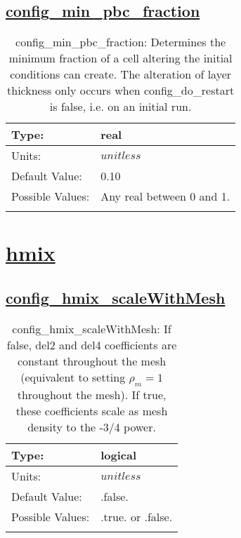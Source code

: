 \subsection[config\_min\_pbc\_fraction]{\hyperref[sec:nm_tab_partial_bottom_cells]{config\_min\_pbc\_fraction}}
\label{subsec:nm_sec_config_min_pbc_fraction}
\begin{center}
\begin{longtable}{| p{2.0in} || p{4.0in} |}
    \hline
    Type: & real \\
    \hline
    Units: & $unitless$ \\
    \hline
    Default Value: & 0.10 \\
    \hline
    Possible Values: & Any real between 0 and 1. \\
    \hline
    \caption{config\_min\_pbc\_fraction: Determines the minimum fraction of a cell altering the initial conditions can create. The alteration of layer thickness only occurs when config\_do\_restart is false, i.e. on an initial run.}
\end{longtable}
\end{center}
\section[hmix]{\hyperref[sec:nm_tab_hmix]{hmix}}
\label{sec:nm_sec_hmix}
\subsection[config\_hmix\_scaleWithMesh]{\hyperref[sec:nm_tab_hmix]{config\_hmix\_scaleWithMesh}}
\label{subsec:nm_sec_config_hmix_scaleWithMesh}
\begin{center}
\begin{longtable}{| p{2.0in} || p{4.0in} |}
    \hline
    Type: & logical \\
    \hline
    Units: & $unitless$ \\
    \hline
    Default Value: & .false. \\
    \hline
    Possible Values: & .true. or .false. \\
    \hline
    \caption{config\_hmix\_scaleWithMesh:  If false, del2 and del4 coefficients are constant throughout the mesh (equivalent to setting  $\rho_m=1$  throughout the mesh).  If true, these coefficients scale as mesh density to the -3/4 power.}
\end{longtable}
\end{center}
